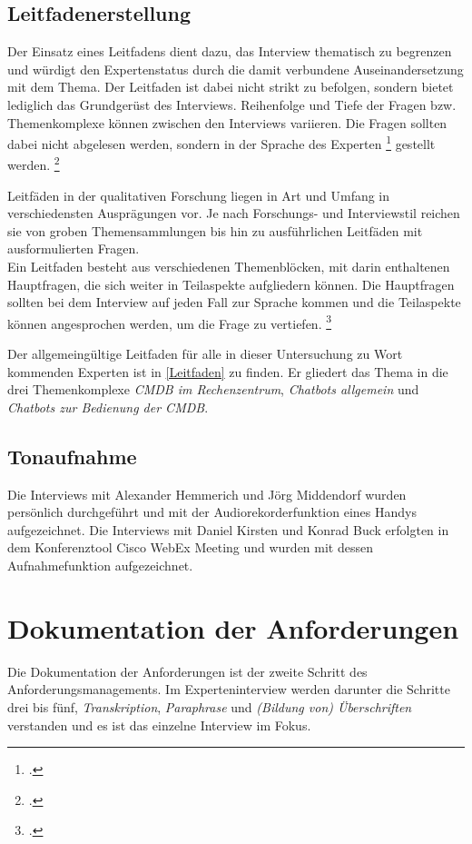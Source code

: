 \subsection{Leitfadenerstellung}
Der Einsatz eines Leitfadens dient dazu, das Interview thematisch zu begrenzen und würdigt den Expertenstatus durch die damit verbundene Auseinandersetzung mit dem Thema. Der Leitfaden ist dabei nicht strikt zu befolgen, sondern bietet lediglich das Grundgerüst des Interviews. Reihenfolge und Tiefe der Fragen bzw. Themenkomplexe können zwischen den Interviews variieren. Die Fragen sollten dabei nicht abgelesen werden, sondern in der \glqq{}Sprache des Experten\grqq
\footcite[][449]{Meuser_1991_Interview}
gestellt werden.
\footcite[Vgl.][448\psq]{Meuser_1991_Interview}

Leitfäden in der qualitativen Forschung liegen in Art und Umfang in verschiedensten Ausprägungen vor. Je nach Forschungs- und Interviewstil reichen sie von groben Themensammlungen bis hin zu ausführlichen Leitfäden mit ausformulierten Fragen.\\
Ein Leitfaden besteht aus verschiedenen Themenblöcken, mit darin enthaltenen Hauptfragen, die sich weiter in Teilaspekte aufgliedern können. Die Hauptfragen sollten bei dem Interview auf jeden Fall zur Sprache kommen und die Teilaspekte können angesprochen werden, um die Frage zu vertiefen.
\footcite[Vgl.][27\psq]{Bogner_2014_Interview}

Der allgemeingültige Leitfaden für alle in dieser Untersuchung zu Wort kommenden Experten ist in \autoref{Leitfaden} zu finden. Er gliedert das Thema in die drei Themenkomplexe \textit{CMDB im Rechenzentrum}, \textit{Chatbots allgemein} und \textit{Chatbots zur Bedienung der CMDB}.

\subsection{Tonaufnahme}
Die Interviews mit Alexander Hemmerich und Jörg Middendorf wurden persönlich durchgeführt und mit der Audiorekorderfunktion eines Handys aufgezeichnet. Die Interviews mit Daniel Kirsten und Konrad Buck erfolgten in dem Konferenztool Cisco WebEx Meeting und wurden mit dessen Aufnahmefunktion aufgezeichnet.



\section{Dokumentation der Anforderungen}
Die Dokumentation der Anforderungen ist der zweite Schritt des Anforderungsmanagements. Im Experteninterview werden darunter die Schritte drei bis fünf, \textit{Transkription}, \textit{Paraphrase} und \textit{(Bildung von) Überschriften} verstanden und es ist das einzelne Interview im Fokus.

